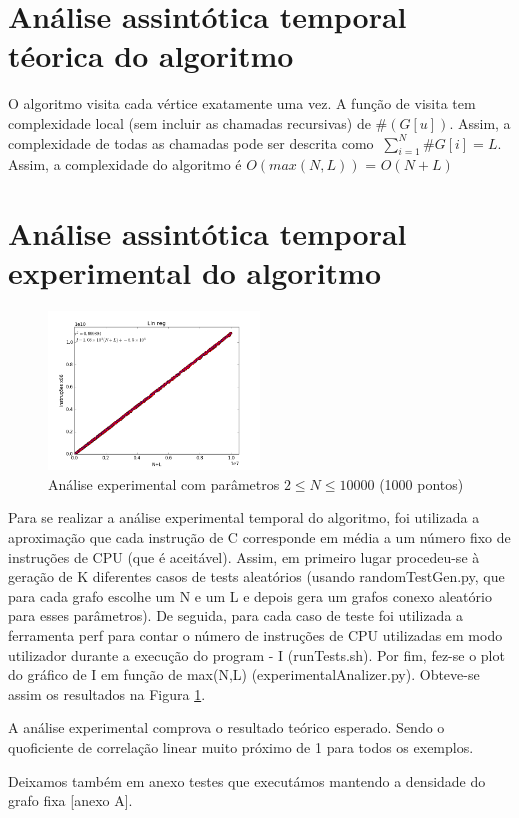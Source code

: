 \documentclass{scrartcl}
\begin{document}
\section*{Análise assintótica temporal téorica do algoritmo}
O algoritmo visita cada vértice exatamente uma vez. A função de visita tem complexidade local (sem incluir as chamadas recursivas) de $\#(G[u])$. Assim, a complexidade de todas as chamadas pode ser descrita como $\ \sum_{i=1}^{N} \#G[i] = L$.
Assim, a complexidade do algoritmo é $O(max(N,L))$ = $O(N+L)$

\section*{Análise assintótica temporal experimental do algoritmo}
\begin{figure} %
	\centering
	\includegraphics[width=0.5\textwidth]{../images/analiseExp_1e5.png}
	\caption{Análise experimental com parâmetros $2 \le N \le 10000 $ (1000 pontos)}
	\label{fig:analexp}
\end{figure}
Para se realizar a análise experimental temporal do algoritmo, foi utilizada a aproximação que cada instrução de C corresponde em média a um número fixo de instruções de CPU (que é aceitável). Assim, em primeiro lugar procedeu-se à geração de K diferentes casos de tests aleatórios (usando randomTestGen.py, que para cada grafo escolhe um N e um L e depois gera um grafos conexo aleatório para esses parâmetros). De seguida, para cada caso de teste foi utilizada a ferramenta perf para contar o número de instruções de CPU utilizadas em modo utilizador durante a execução do program - I (runTests.sh). Por fim, fez-se o plot do gráfico de I em função de max(N,L) (experimentalAnalizer.py). Obteve-se assim os resultados na Figura \ref{fig:analexp}.\par
A análise experimental comprova o resultado teórico esperado. Sendo o quoficiente de correlação linear muito próximo de 1 para todos os exemplos.\par
Deixamos também em anexo testes que executámos mantendo a densidade do grafo fixa [anexo A].
\end{document}
